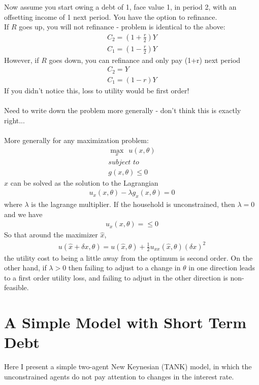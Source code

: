 \documentclass[AER]{AEA}
\begin{document}
\newpage

Now assume you start owing a debt of 1, face value 1, in period 2, with an offsetting income of 1 next period. You have the option to refinance.\\
If $R$ goes up, you will not refinance - problem is identical to the above:
 \begin{align*}
 C_2 = (1+\frac{r}{2}) Y \\
 C_1 = (1-\frac{r}{2 }) Y
 \end{align*}
However, if $R$ goes down, you can refinance and only pay (1+r) next period
 \begin{align*}
C_2 =  Y \\
C_1 = (1-r) Y
\end{align*}
If you didn't notice this, loss to utility would be first order!\\
\\
Need to write down the problem more generally - don't think this is exactly right...\\
\\
More generally for any maximization problem:
\begin{align*}
\underset{x}{\max}\ \ u(x,\theta)\\
\textit{subject to}\\
g(x,\theta) \leq 0
\end{align*}
$x$ can be solved as the solution to the Lagrangian
\begin{align*}
 u_x(x,\theta)- \lambda g_x(x,\theta) = 0
\end{align*}
where $\lambda$ is the lagrange multiplier. If the household is unconstrained, then $\lambda=0$ and we have
\begin{align*}
 u_x(x,\theta)= \leq 0
\end{align*}
So that around the maximizer $\hat{x}$,
\begin{align*}
 u(\hat{x}+\delta x,\theta)= u(\hat{x},\theta) + \frac{1}{2}u_{xx}(\hat{x},\theta)(\delta x)^2
\end{align*}
the utility cost to being a little away from the optimum is second order. On the other hand, if $\lambda > 0$ then failing to adjust to a change in $\theta$ in one direction leads to a first order utility loss, and failing to adjust in the other direction is non-feasible.

\section{A Simple Model with Short Term Debt}
Here I present a simple two-agent New Keynesian (TANK) model, in which the unconstrained agents do not pay attention to changes in the interest rate.\\
\end{document}
